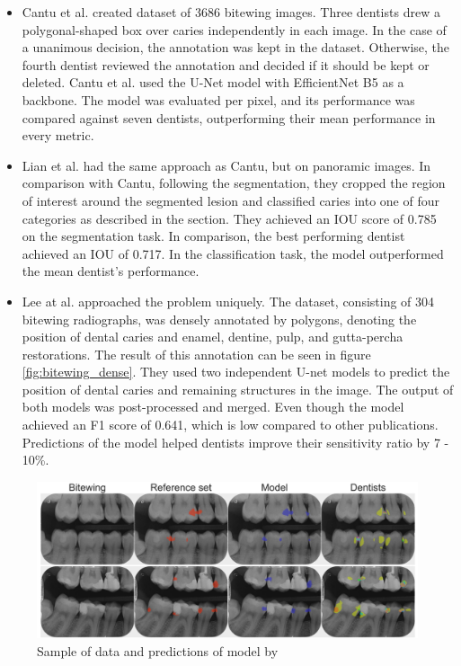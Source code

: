 \begin{itemize}
    \item{Cantu et al. \cite{Cantu2020}} created dataset of 3686 bitewing images. Three dentists drew a polygonal-shaped box over caries independently in each image. In the case of a unanimous decision, the annotation was kept in the dataset. Otherwise, the fourth dentist reviewed the annotation and decided if it should be kept or deleted. Cantu et al. used the U-Net model with EfficientNet B5 as a backbone. The model was evaluated per pixel, and its performance was compared against seven dentists, outperforming their mean performance in every metric.
    \item{Lian et al. \cite{Lian2021}} had the same approach as Cantu, but on panoramic images. In comparison with Cantu, following the segmentation, they cropped the region of interest around the segmented lesion and classified caries into one of four categories as described in the section. They achieved an IOU score of 0.785 on the segmentation task. In comparison, the best performing dentist achieved an IOU of 0.717. In the classification task, the model outperformed the mean dentist's performance.
    \item {Lee at al. \cite{Lee2021}}  approached the problem uniquely. The dataset, consisting of 304 bitewing radiographs, was densely annotated by polygons, denoting the position of dental caries and enamel, dentine, pulp, and gutta-percha restorations. The result of this annotation can be seen in figure \ref{fig:bitewing_dense}. They used two independent U-net models to predict the position of dental caries and remaining structures in the image. The output of both models was post-processed and merged. Even though the model achieved an F1 score of 0.641, which is low compared to other publications. Predictions of the model helped dentists improve their sensitivity ratio by 7 - 10\%.
\end{itemize}

\begin{figure}
    \centering
    \includegraphics[width=\linewidth]{images/segmentatic_literature.png}
    \caption{Sample of data and predictions of model by }
    \label{fig:segmentation_lit}
\end{figure}

